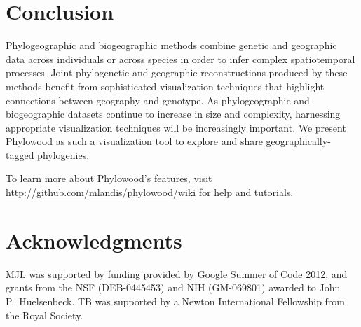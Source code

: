 \documentclass[11pt]{article}
\begin{document}
\section{Conclusion}

Phylogeographic and biogeographic methods combine genetic and geographic data across individuals or across species in order to infer complex spatiotemporal processes. Joint phylogenetic and geographic reconstructions produced by these methods benefit from sophisticated visualization techniques that highlight connections between geography and genotype. As phylogeographic and biogeographic datasets continue to increase in size and complexity, harnessing appropriate visualization techniques will be increasingly important. We present Phylowood as such a visualization tool to explore and share geographically-tagged phylogenies. 

To learn more about Phylowood's features, visit \url{http://github.com/mlandis/phylowood/wiki} for help and tutorials.

\section*{Acknowledgments}

MJL was supported by funding provided by Google Summer of Code 2012, and grants from the NSF (DEB-0445453) and NIH (GM-069801) awarded to John P.\ Huelsenbeck.  TB was supported by a Newton International Fellowship from the Royal Society.  



\newpage
\newpage
\end{document}
